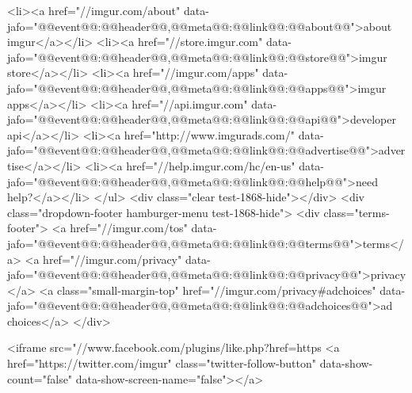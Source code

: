                             <li><a href="//imgur.com/about"  data-jafo="{@@event@@:@@header@@,@@meta@@:{@@link@@:@@about@@}}">about imgur</a></li>
                            <li><a href="//store.imgur.com" data-jafo="{@@event@@:@@header@@,@@meta@@:{@@link@@:@@store@@}}">imgur store</a></li>
                            <li><a href="//imgur.com/apps"  data-jafo="{@@event@@:@@header@@,@@meta@@:{@@link@@:@@apps@@}}">imgur apps</a></li>
                            <li><a href="//api.imgur.com" data-jafo="{@@event@@:@@header@@,@@meta@@:{@@link@@:@@api@@}}">developer api</a></li>
                            <li><a href="http://www.imgurads.com/" data-jafo="{@@event@@:@@header@@,@@meta@@:{@@link@@:@@advertise@@}}">advertise</a></li>
                            <li><a href="//help.imgur.com/hc/en-us" data-jafo="{@@event@@:@@header@@,@@meta@@:{@@link@@:@@help@@}}">need help?</a></li>
                        </ul>
                        <div class="clear test-1868-hide"></div>
                        <div class="dropdown-footer hamburger-menu test-1868-hide">
                            <div class="terms-footer">
                                <a href="//imgur.com/tos"  data-jafo="{@@event@@:@@header@@,@@meta@@:{@@link@@:@@terms@@}}">terms</a>
                                <a href="//imgur.com/privacy"  data-jafo="{@@event@@:@@header@@,@@meta@@:{@@link@@:@@privacy@@}}">privacy</a>
                                <a class="small-margin-top" href="//imgur.com/privacy#adchoices" data-jafo="{@@event@@:@@header@@,@@meta@@:{@@link@@:@@adchoices@@}}">ad choices</a>
                            </div>
                             
                                <iframe src="//www.facebook.com/plugins/like.php?href=https%
                                <a href="https://twitter.com/imgur" class="twitter-follow-button" data-show-count="false" data-show-screen-name="false"></a>
                            
